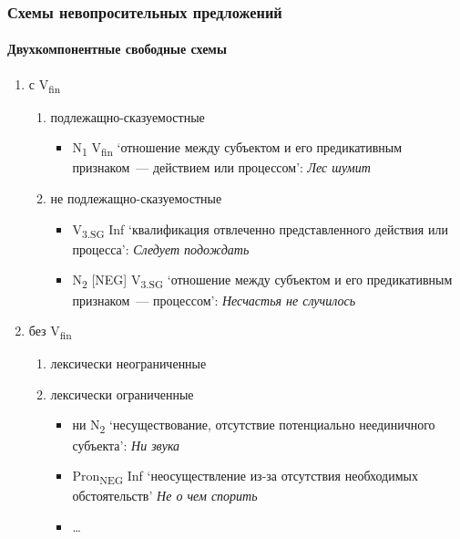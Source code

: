 \begin{frame}
  \frametitle{Схемы невопросительных предложений}
  \framesubtitle{Двухкомпонентные свободные схемы}
  \small

  \begin{enumerate}
    \item с V\textsubscript{fin} \begin{enumerate}
      \item подлежащно-сказуемостные \begin{itemize}
        \item N\textsubscript{1} V\textsubscript{fin} `отношение между субъектом и его предикативным признаком~--- действием или процессом': \textit{Лес шумит}
      \end{itemize}
      \item<2-> не подлежащно-сказуемостные \begin{itemize}
        \item V\textsubscript{3.\textsc{SG}} Inf `квалификация отвлеченно представленного действия или процесса': \textit{Следует подождать}
        \item N\textsubscript{2} [\textsc{NEG}] V\textsubscript{3.\textsc{SG}} `отношение между субъектом и его предикативным признаком~--- процессом': \textit{Несчастья не случилось}
      \end{itemize}
    \end{enumerate}

    \item<3-> без V\textsubscript{fin} \begin{enumerate}
      \item лексически неограниченные
      \item лексически ограниченные \begin{itemize}
        \item ни N\textsubscript{2} `несуществование, отсутствие потенциально неединичного субъекта': \textit{Ни звука}
        \item Pron\textsubscript{\textsc{NEG}} Inf `неосуществление из-за отсутствия необходимых обстоятельств' \textit{Не о чем спорить}
        \item \ldots
      \end{itemize}
    \end{enumerate}
  \end{enumerate}
\end{frame}

